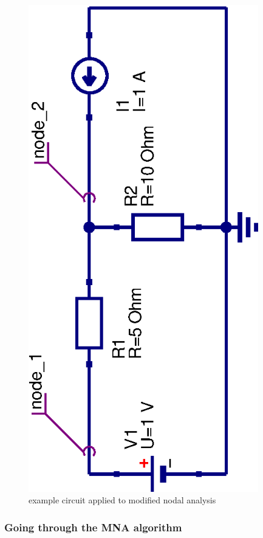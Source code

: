 \documentclass[10pt]{report}
\begin{document}
\begin{figure}[ht]
\begin{center}
\includegraphics[angle=-90,width=10cm]{MNAexample}
\end{center}
\caption{example circuit applied to modified nodal analysis}
\label{fig:MNAexample}
\end{figure}
\FloatBarrier

\subsubsection{Going through the MNA algorithm}
\end{document}
